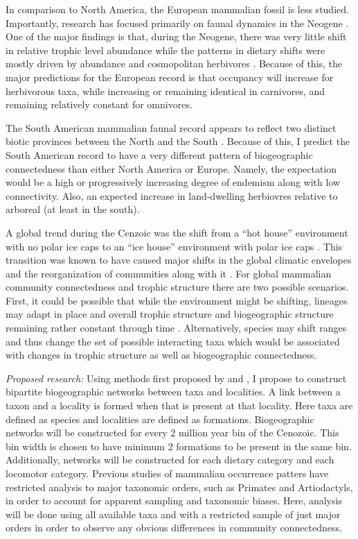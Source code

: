 \documentclass[12pt,letterpaper]{article}
\begin{document}
In comparison to North America, the European mammalian fossil is less studied. Importantly, research has focused primarily on faunal dynamics in the Neogene \citep{Jernvall2002,Jernvall2004,Liow2008,Raia2006,Raia2005,Raia2011c}. One of the major findings is that, during the Neogene, there was very little shift in relative trophic level abundance \citep{Jernvall2004} while the patterns in dietary shifts were mostly driven by abundance and cosmopolitan herbivores \citep{Jernvall2002}. Because of this, the major predictions for the European record is that occupancy will increase for herbivorous taxa, while increasing or remaining identical in carnivores, and remaining relatively constant for omnivores. 

The South American mammalian faunal record appears to reflect two distinct biotic provinces between the North and the South \citep{Macfadden1997,Macfadden2006,Flynn1998a,Patterson1968}. Because of this, I predict the South American record to have a very different pattern of biogeographic connectedness than either North America or Europe. Namely, the expectation would be a high or progressively increasing degree of endemism along with low connectivity. Also, an expected increase in land-dwelling herbiovres relative to arboreal (at least in the south).

A global trend during the Cenzoic was the shift from a ``hot house'' environment with no polar ice caps to an ``ice house'' environment with polar ice caps \citep{Zachos2008,Zachos2001}. This transition was known to have caused major shifts in the global climatic envelopes and the reorganization of communities along with it \citep{Janis1993a,Fortelius2002,Blois2009,Alroy2000g,Figueirido2012}. For global mammalian community connectedness and trophic structure there are two possible scenarios. First, it could be possible that while the environment might be shifting, lineages may adapt in place and overall trophic structure and biogeographic structure remaining rather constant through time \citep{Jernvall2004}. Alternatively, species may shift ranges and thus change the set of possible interacting taxa which would be associated with changes in trophic structure as well as biogeographic connectedness.

\textit{Proposed research:}
Using methods first proposed by \citet{Sidor2013} and \citet{Vilhena2013}, I propose to construct bipartite biogeographic networks between taxa and localities. A link between a taxon and a locality is formed when that is present at that locality. Here taxa are defined as species and localities are defined as formations. Biogeographic networks will be constructed for every 2 million year bin of the Cenozoic. This bin width is chosen to have minimum 2 formations to be present in the same bin. Additionally, networks will be constructed for each dietary category and each locomotor category. Previous studies of mammalian occurrence patters have restricted analysis to major taxonomic orders, such as Primates and Artiodactyls, in order to account for apparent sampling and taxonomic biases. Here, analysis will be done using all available taxa and with a restricted sample of just major orders in order to observe any obvious differences in community connectedness.
\end{document}
